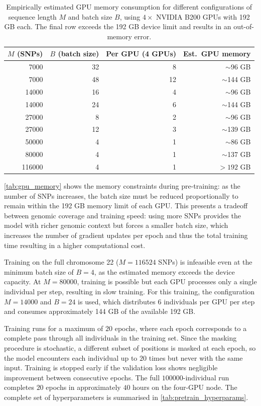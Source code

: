 \begin{table}[h]
\centering
\caption{Empirically estimated GPU memory consumption for different configurations of sequence length $M$ and batch size $B$, using $4 \times$ NVIDIA B200 GPUs with 192 GB each. The final row exceeds the 192 GB device limit and results in an out-of-memory error.}
\label{tab:gpu_memory}
\begin{tabular}{r r r r}
\toprule
$M$ (SNPs) & $B$ (batch size) & Per GPU (4 GPUs) & Est.\ GPU memory \\
\midrule
7000   & 32 & 8  & $\sim$96 GB \\
7000   & 48 & 12 & $\sim$144 GB \\
14000  & 16 & 4  & $\sim$96 GB \\
14000  & 24 & 6  & $\sim$144 GB \\
27000  & 8  & 2  & $\sim$96 GB \\
27000  & 12 & 3  & $\sim$139 GB \\
50000  & 4  & 1  & $\sim$86 GB \\
80000  & 4  & 1  & $\sim$137 GB \\
116000 & 4  & 1  & $>192$ GB  \\
\bottomrule
\end{tabular}
\end{table}

\autoref{tab:gpu_memory} shows the memory constraints during pre-training: as the number of SNPs increases, the batch size must be reduced proportionally to remain within the 192 GB memory limit of each GPU. This presents a tradeoff between genomic coverage and training speed: using more SNPs provides the model with richer genomic context but forces a smaller batch size, which increases the number of gradient updates per epoch and thus the total training time resulting in a higher computational cost. 

Training on the full chromosome 22 ($M = 116524$ SNPs) is infeasible even at the minimum batch size of $B = 4$, as the estimated memory exceeds the device capacity. At $M = 80000$, training is possible but each GPU processes only a single individual per step, resulting in slow training. For this training, the configuration $M = 14000$ and $B = 24$ is used, which distributes 6 individuals per GPU per step and consumes approximately 144 GB of the available 192 GB.

Training runs for a maximum of $20$ epochs, where each epoch corresponds to a complete pass through all individuals in the training set. Since the masking procedure is stochastic, a different subset of positions is masked at each epoch, so the model encounters each individual up to $20$ times but never with the same input. Training is stopped early if the validation loss shows negligible improvement between consecutive epochs. The full $100000$-individual run completes $20$ epochs in approximately $40$ hours on the four-GPU node. The complete set of hyperparameters is summarised in \autoref{tab:pretrain_hyperparams}.

